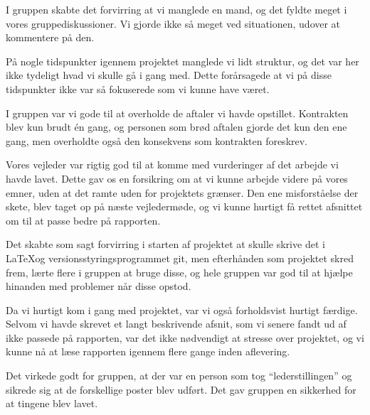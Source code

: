 I gruppen skabte det forvirring at vi manglede en mand, og det fyldte meget i vores gruppediskussioner. Vi gjorde ikke så meget ved situationen, udover at kommentere på den.

På nogle tidspunkter igennem projektet manglede vi lidt struktur, og det var her ikke tydeligt hvad vi skulle gå i gang med. Dette forårsagede at vi på disse tidspunkter ikke var så fokuserede som vi kunne have været.

I gruppen var vi gode til at overholde de aftaler vi havde opstillet. Kontrakten blev kun brudt \'en gang, og personen som brød aftalen gjorde det kun den ene gang, men overholdte også den konsekvens som kontrakten foreskrev. 

Vores vejleder var rigtig god til at komme med vurderinger af det arbejde vi havde lavet. Dette gav os en forsikring om at vi kunne arbejde videre på vores emner, uden at det ramte uden for projektets grænser. Den ene misforståelse der skete, blev taget op på næste vejledermøde, og vi kunne hurtigt få rettet afsnittet om til at passe bedre på rapporten.

Det skabte som sagt forvirring i starten af projektet at skulle skrive det i \LaTeX og versionsstyringsprogrammet git, men efterhånden som projektet skred frem, lærte flere i gruppen at bruge disse, og hele gruppen var god til at hjælpe hinanden med problemer når disse opstod.

Da vi hurtigt kom i gang med projektet, var vi også forholdsvist hurtigt færdige. Selvom vi havde skrevet et langt beskrivende afsnit, som vi senere fandt ud af ikke passede på rapporten, var det ikke nødvendigt at stresse over projektet, og vi kunne nå at læse rapporten igennem flere gange inden aflevering. 

Det virkede godt for gruppen, at der var en person som tog ``lederstillingen'' og sikrede sig at de forskellige poster blev udført. Det gav gruppen en sikkerhed for at tingene blev lavet.